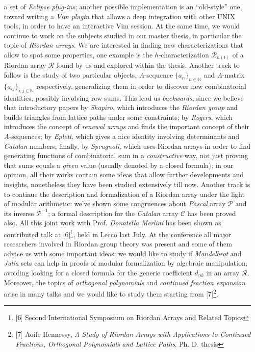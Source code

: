 a set of \emph{Eclipse plug-ins}; another possible implementation is an
``old-style'' one, toward writing a \emph{Vim plugin} that allows a deep
integration with other UNIX tools, in order to have an interactive Vim
session.  At the same time, we would continue to work on the
subjects studied in our master thesis, in particular the topic of
\emph{Riordan arrays}. We are interested in finding new
characterizations that allow to spot some properties, one example is the
$h$-characterization $\mathcal{R}_{h(t)}$ of a Riordan array
$\mathcal{R}$ found by us and explored within the thesis. Another track
to follow is the study of two particular objects, $A$-sequence $\lbrace
a_{n}\rbrace_{n\in\mathbb{N}}$ and $A$-matrix $\lbrace
a_{ij}\rbrace_{i,j\in\mathbb{N}}$ respectively, generalizing them in
order to discover new combinatorial identities, possibly involving row
sums.  This lead us
\emph{backwards}, since we believe that introductory papers by
\emph{Shapiro}, which introduces the \emph{Riordan group} and builds
triangles from lattice paths under some constraints; by \emph{Rogers},
which introduces the concept of \emph{renewal arrays} and finds the
important concept of their $A$-sequences; by \emph{Eplett}, which gives
a nice identity involving determinants and \emph{Catalan} numbers;
finally, by \emph{Sprugnoli}, which uses Riordan arrays in order to find
generating functions of combinatorial sum in a \emph{constructive} way,
not just proving that sums equals a \emph{given} value (usually denoted
by a closed formula); in our opinion, all their works contain some ideas
that allow further developments and insights, nonetheless they have been
studied extensively till now.  Another track is to continue the description
and formalization of a Riordan array under the light of modular
arithmetic: we've shown some congruences about \emph{Pascal} array
$\mathcal{P}$ and its inverse $\mathcal{P}^{-1}$; a formal description
for the \emph{Catalan} array $\mathcal{C}$ has been proved also. All
    this joint work with Prof. \emph{Donatella Merlini} has been shown
    as contributed talk at [6]\footnote{[6] Second International
    Symposium on Riordan Arrays and Related Topics}, held in Lecco last
    July. At the conference all major researchers involved in Riordan
    group theory was present and some of them advice us with some
    important ideas: we would like to study if \emph{Mandelbrot} and
    \emph{Julia} sets can help in proofs of modular formalization by
    algebraic manipulation, avoiding looking for a closed formula for
    the generic coefficient $d_{nk}$ in an array $\mathcal{R}$.
     Moreover, the topics of \emph{orthogonal
    polynomials} and \emph{continued fraction expansion} arise in many
    talks and we would like to study them starting from [7]\footnote{[7]
    Aoife Hennessy, \emph{A Study of Riordan Arrays with Applications to
    Continued Fractions, Orthogonal Polynomials and Lattice Paths}, Ph.
    D.  thesis}.

